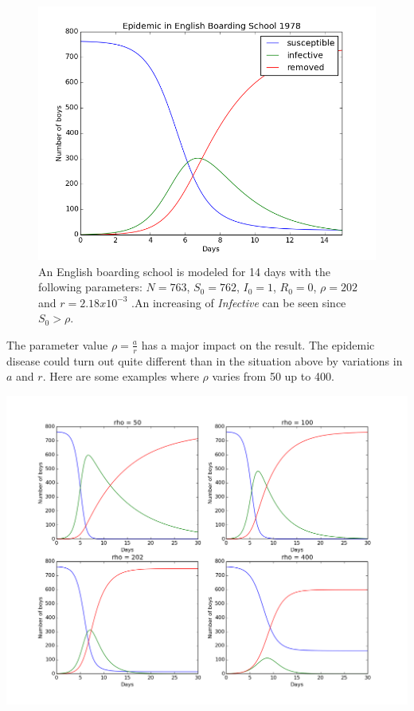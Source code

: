 \documentclass[%
twoside,                 %
final,                   %
10pt]{article}
\begin{document}
\begin{figure}[ht]
  \centerline{\includegraphics[width=0.9\linewidth]{plots/English_boarding_school.png}}
  \caption{
  An English boarding school is modeled for 14 days with the following parameters: $N=763$, $S_0=762$, $I_0=1$, $R_0=0$, $\rho=202$ and $r=2.18 x 10^{-3}$ .An increasing of \emph{Infective} can be seen since $S_0 > \rho$.
  }
\end{figure}


The parameter value $\rho = \frac{a}{r}$ has a major impact on the result. The epidemic disease could turn out quite different than in the situation above by variations in $a$ and $r$. Here are some examples where $\rho$ varies from 50 up to 400.


\begin{center}  %
  \centerline{\includegraphics[width=0.9\linewidth]{plots/English_boarding_school_changes.png}}
\end{center}
\end{document}

